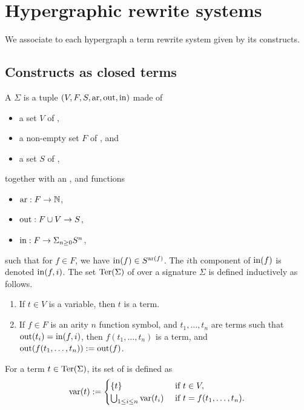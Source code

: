 
\section{Hypergraphic rewrite systems} 
\label{s:rewriting}

We associate to each hypergraph a term rewrite system given by its constructs.


\subsection{Constructs as closed terms}

A  $\Sigma$ is a tuple $(V,F,S,\mathrm{ar},\operatorname{out},\operatorname{in})$ made of 
\begin{itemize}
  \item a set $V$ of ,
  \item a non-empty set $F$ of , and
  \item a set $S$ of ,
\end{itemize}
together with an ,  and  functions
\begin{itemize}
  \item $\mathrm{ar} : F \to \mathbb{N}$,
  \item $\operatorname{out} : F \cup V \to S$,
  \item $\operatorname{in} : F \to \Sigma_{n \geq 0} S^{n}$,
\end{itemize}
such that for $f \in F$, we have $\operatorname{in}(f) \in S^{\mathrm{ar}(f)}$. 
The $i$th component of $\operatorname{in}(f)$ is denoted $\operatorname{in}(f,i)$.
The set $\operatorname{Ter}(\Sigma)$ of  over a signature $\Sigma$ is defined inductively as follows. 
\begin{enumerate}
  \item If $t \in V$ is a variable, then $t$ is a term.
  \item If $f \in F$ is an arity $n$ function symbol, and $t_1,\ldots,t_n$ are terms such that $\operatorname{out}(t_i)=\operatorname{in}(f,i)$, then $f(t_1,\ldots,t_n)$ is a term, and $\operatorname{out}(f(t_1,\ldots,t_n)):=\operatorname{out}(f)$.
\end{enumerate}
For a term $t \in \operatorname{Ter}(\Sigma)$, its set of  is defined as 
\begin{equation*}
  \operatorname{var}(t) := 
  \begin{cases}
    \{t\} & \text{ if } t \in V, \\
    \bigcup_{1 \leq i \leq n}\operatorname{var}(t_i) & \text{ if } t=f(t_1,\ldots,t_n).
  \end{cases}
\end{equation*}
